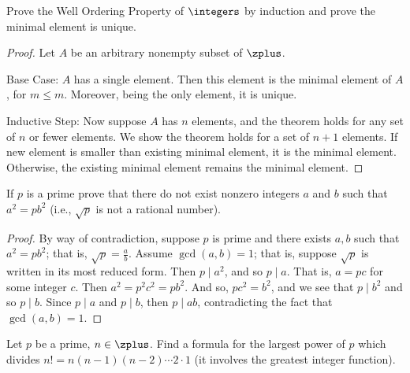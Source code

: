 
\begin{exercise}
	Prove the Well Ordering Property of $\integers$ by induction and prove the minimal element is unique.
\end{exercise}

\begin{proof}
	Let $A$ be an arbitrary nonempty subset of $\zplus$.
	
	Base Case: $A$ has a single element. Then this element is the minimal element of $A$, for $m \leq m$. Moreover, being the only element, it is unique.
	
	Inductive Step: Now suppose $A$ has $n$ elements, and the theorem holds for any set of $n$ or fewer elements. We show the theorem holds for a set of $n + 1$ elements. If new element is smaller than existing minimal element, it is the minimal element. Otherwise, the existing minimal element remains the minimal element.
\end{proof}


\begin{exercise}
	If $p$ is a prime prove that there do not exist nonzero integers $a$ and $b$ such that $a^2 = pb^2$ (i.e., $\sqrt{p}$ is not a rational number).
\end{exercise}

\begin{proof}
	By way of contradiction, suppose $p$ is prime and there exists 
	$a,b$ such that $a^2 = pb^2$; that is, $\sqrt{p} = 
	\frac{a}{b}$. Assume $\gcd(a,b) = 1$; that is, suppose 
	$\sqrt{p}$ is written in its most reduced form. Then $p \mid 
	a^2$, and so $p \mid a$. That is, $a = pc$ for some integer 
	$c$. Then $a^2 = p^2c^2 = pb^2$. And so, $pc^2 = b^2$, and we 
	see that $p \mid b^2$ and so $p \mid b$. Since $p \mid a$ and 
	$p \mid b$, then $p \mid ab$, contradicting the fact that 
	$\gcd(a,b) = 1$.
\end{proof}


\begin{exercise}
	Let $p$ be a prime, $n \in \zplus$. Find a formula for the largest power of $p$ which divides $n! = n(n-1)(n-2) \cdots 2 \cdot 1$ (it involves the greatest integer function).
\end{exercise}

